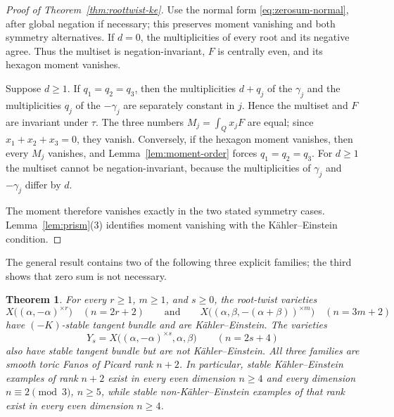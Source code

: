\documentclass[11pt]{amsart}
\newtheorem{theorem}{Theorem}[section]
\theoremstyle{definition}
\theoremstyle{remark}
\begin{document}
\begin{proof}[Proof of Theorem~\ref{thm:roottwist-ke}]
Use the normal form \eqref{eq:zerosum-normal}, after global negation if
necessary; this preserves moment vanishing and both symmetry alternatives.
If $d=0$, the multiplicities of every root and its negative
agree. Thus the multiset is negation-invariant, $F$ is centrally even,
and its hexagon moment vanishes.

Suppose $d\ge1$. If $q_1=q_2=q_3$, then the multiplicities $d+q_j$ of
the $\gamma_j$ and the multiplicities $q_j$ of the $-\gamma_j$ are
separately constant in $j$. Hence the multiset and $F$ are invariant under
$\tau$. The three numbers $M_j=\int_Qx_jF$ are equal; since
$x_1+x_2+x_3=0$, they vanish. Conversely, if the hexagon moment vanishes,
then every $M_j$ vanishes, and Lemma~\ref{lem:moment-order} forces
$q_1=q_2=q_3$. For $d\ge1$ the multiset cannot be negation-invariant,
because the multiplicities of $\gamma_j$ and $-\gamma_j$ differ by $d$.

The moment therefore vanishes exactly in the two stated symmetry cases.
Lemma~\ref{lem:prism}(3) identifies moment vanishing with the
K\"ahler--Einstein condition.
\end{proof}

The general result contains two of the following three explicit families;
the third shows that zero sum is not necessary.

\begin{theorem}\label{thm:families}
For every $r \ge 1$, $m \ge 1$, and $s\ge0$, the root-twist varieties
\[
X\bigl((\alpha, -\alpha)^{\times r}\bigr) \quad (n = 2r + 2)
\qquad\text{and}\qquad
X\bigl((\alpha, \beta, -(\alpha{+}\beta))^{\times m}\bigr) \quad (n = 3m+2)
\]
have $(-K)$-stable tangent bundle and are K\"ahler--Einstein. The varieties
\[
Y_s=X\bigl((\alpha,-\alpha)^{\times s},\alpha,\beta\bigr)
\qquad (n=2s+4)
\]
also have stable tangent bundle but are not K\"ahler--Einstein. All three
families are smooth toric Fanos of Picard rank $n+2$. In particular, stable
K\"ahler--Einstein examples of rank $n+2$ exist in every even dimension
$n\ge4$ and every dimension $n\equiv2\pmod3$, $n\ge5$, while stable
non-K\"ahler--Einstein examples of that rank exist in every even dimension
$n\ge4$.
\end{theorem}
\end{document}
